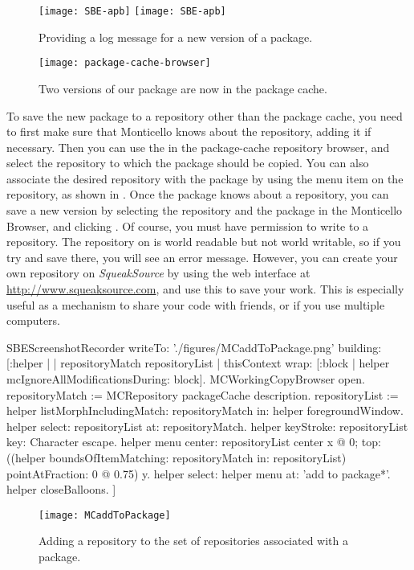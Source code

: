 \documentclass[a4paper,10pt,twoside]{book}
\begin{document}
\begin{figure}[tbp]
	\begin{center}
	\ifluluelse
		{\texttt{[image: SBE-apb]}}
		{\texttt{[image: SBE-apb]}}
	\end{center}
	\caption{Providing a log message for a new version of a package.}
	\label{fig:SBE-apb}
\end{figure}

\begin{figure}[tbp]
	\begin{center}
	\texttt{[image: package-cache-browser]}
	\end{center}
	\caption{Two versions of our package are now in the package cache.}
	\label{fig:package-cache-browser}
\end{figure}

To save the new package to a repository other than the package cache, you need to first make sure that Monticello knows about the repository, adding it if necessary.
Then you can use the  in the package-cache repository browser, and select the repository to which the package should be copied.
You can also associate the desired repository with the package by using the  menu item  on the repository, as shown in .
Once the package knows about a repository, you can save a new version by selecting the repository and the package in the Monticello Browser, and clicking .
Of course, you must have permission to write to a repository.
The  repository on  is world readable but not world writable, so if you try and save there, you will see an error message.
However, you can create your own repository on \emph{SqueakSource} by using the web interface at \url{http://www.squeaksource.com}, and use this to save your work.
This is especially useful as a mechanism to share your code with friends, or if you use multiple computers.

\begin{ExecuteSmalltalkScript}
SBEScreenshotRecorder writeTo: './figures/MCaddToPackage.png' building: [:helper |
	| repositoryMatch repositoryList |
	thisContext wrap: [:block | helper mcIgnoreAllModificationsDuring: block].
	MCWorkingCopyBrowser open.
	repositoryMatch := MCRepository packageCache description.
	repositoryList := helper listMorphIncludingMatch: repositoryMatch in: helper foregroundWindow.
	helper select: repositoryList at: repositoryMatch.
	helper keyStroke: repositoryList key: Character escape.
	helper menu
		center: repositoryList center x @ 0;
		top: ((helper boundsOfItemMatching: repositoryMatch in: repositoryList)
			pointAtFraction: 0 @ 0.75) y.
	helper select: helper menu at: 'add to package*'.
	helper closeBalloons.
]
\end{ExecuteSmalltalkScript}
\begin{figure}[tbp]
	\begin{center}
		\texttt{[image: MCaddToPackage]}
	\end{center}
	\caption{Adding a repository to the set of repositories associated with a package.}
	\label{fig:associateRepository}
\end{figure}
\end{document}
